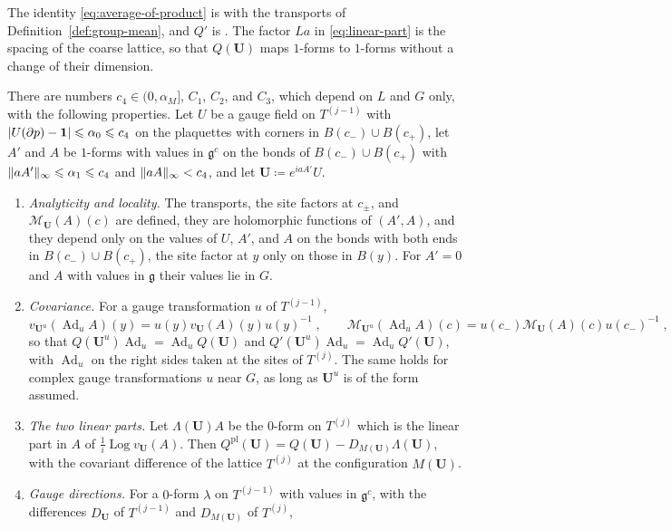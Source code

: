 \documentclass[11pt]{preprint}
\newcommand{\id}{\mathbf 1}
\newcommand{\Ad}{\operatorname{Ad}}
\DeclarePairedDelimiter{\abs}{\lvert}{\rvert}
\DeclarePairedDelimiter{\norm}{\lVert}{\rVert}
\numberwithin{equation}{section}
\begin{document}
The identity \eqref{eq:average-of-product} is \cite[(3.113), p.~418]{BalabanPBG} with the transports of Definition~\ref{def:group-mean}, and $Q'$ is \cite[(3.19), p.~393]{BalabanPBG}. The factor $La$ in \eqref{eq:linear-part} is the spacing of the coarse lattice, so that $Q(\mathbf U)$ maps $1$-forms to $1$-forms without a change of their dimension.

\begin{proposition}\label{prop:relative-average}
There are numbers $c_4 \in (0, \alpha_M]$, $C_1$, $C_2$, and $C_3$, which depend on $L$ and $G$ only, with the following properties. Let $U$ be a gauge field on $T^{(j-1)}$ with $\abs{U(\partial p) - \id} \leqslant \alpha_0 \leqslant c_4$ on the plaquettes with corners in $B(c_-) \cup B(c_+)$, let $A'$ and $A$ be $1$-forms with values in $\mathfrak g^c$ on the bonds of $B(c_-) \cup B(c_+)$ with $\norm{aA'}_\infty \leqslant \alpha_1 \leqslant c_4$ and $\norm{aA}_\infty < c_4$, and let $\mathbf U \coloneqq e^{iaA'}U$.
\begin{enumerate}[label=(\roman*)]
\item \emph{Analyticity and locality.} The transports, the site factors at $c_\pm$, and $\mathcal M_{\mathbf U}(A)(c)$ are defined, they are holomorphic functions of $(A', A)$, and they depend only on the values of $U$, $A'$, and $A$ on the bonds with both ends in $B(c_-) \cup B(c_+)$, the site factor at $y$ only on those in $B(y)$. For $A' = 0$ and $A$ with values in $\mathfrak g$ their values lie in $G$.
\item \emph{Covariance.} For a gauge transformation $u$ of $T^{(j-1)}$,
\[
    v_{\mathbf U^u}(\Ad_uA)(y) = u(y)v_{\mathbf U}(A)(y)u(y)^{-1}\;,
    \qquad
    \mathcal M_{\mathbf U^u}(\Ad_uA)(c) = u(c_-)\mathcal M_{\mathbf U}(A)(c)u(c_-)^{-1}\;,
\]
so that $Q(\mathbf U^u)\Ad_u = \Ad_uQ(\mathbf U)$ and $Q'(\mathbf U^u)\Ad_u = \Ad_uQ'(\mathbf U)$, with $\Ad_u$ on the right sides taken at the sites of $T^{(j)}$. The same holds for complex gauge transformations $u$ near $G$, as long as $\mathbf U^u$ is of the form assumed.
\item \emph{The two linear parts.} Let $\Lambda(\mathbf U)A$ be the $0$-form on $T^{(j)}$ which is the linear part in $A$ of $\frac{1}{i}\operatorname{Log}v_{\mathbf U}(A)$. Then $Q^{\mathrm{pl}}(\mathbf U) = Q(\mathbf U) - D_{M(\mathbf U)}\Lambda(\mathbf U)$, with the covariant difference of the lattice $T^{(j)}$ at the configuration $M(\mathbf U)$.
\item \emph{Gauge directions.} For a $0$-form $\lambda$ on $T^{(j-1)}$ with values in $\mathfrak g^c$, with the differences $D_{\mathbf U}$ of $T^{(j-1)}$ and $D_{M(\mathbf U)}$ of $T^{(j)}$,

\end{enumerate}
\end{proposition}
\end{document}
